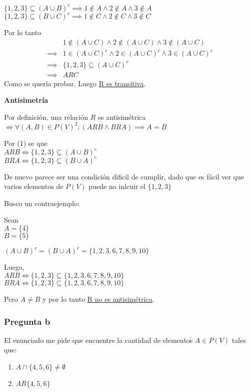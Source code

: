 $ \{ 1,2,3 \} \subseteq (A\cup B)^c \implies 1\not \in A \wedge 2 \not \in A \wedge 3 \not \in A $ \\
$ \{ 1,2,3 \} \subseteq (B\cup C)^c \implies 1\not \in C \wedge 2 \not \in C \wedge 3 \not \in C $

Por lo tanto
\begin{align*}
    & 1\not \in (A\cup C) \wedge 2 \not \in (A\cup C) \wedge 3 \not \in (A\cup C) \\
    \implies & 1 \in (A\cup C)^c \wedge 2 \in (A\cup C)^c \wedge 3 \in (A\cup C)^c \\
    \implies & \{ 1,2,3 \} \subseteq (A\cup C)^c \\
    \implies & ARC
\end{align*}
Como se quería probar. Luego \underline{R es transitiva}.

\textbf{Antisimetría}

Por definición, una relación $R$ es antisimétrica $ \iff \forall (A,B) \in P(V)^2: (ARB \wedge BRA) \implies A=B$

Por (1) se que \\
$ ARB \iff \{ 1,2,3 \} \subseteq (A\cup B)^c$ \\
$ BRA \iff \{ 1,2,3 \} \subseteq (B\cup A)^c$ 

De nuevo parece ser una condición dificil de cumplir, dado que es fácil ver que varios elementos de $ P(V) $ puede no inlcuir el $ \{ 1,2,3 \} $

Busco un contraejemplo:

Sean \\ 
$ A = \{ 4 \} $ \\
$ B = \{ 5 \} $

$ (A\cup B)^c = (B\cup A)^c = \{ 1,2,3,6,7,8,9,10 \} $

Luego, \\
$ ARB \iff \{ 1,2,3 \} \subseteq \{ 1,2,3,6,7,8,9,10 \} $ \\
$ BRA \iff \{ 1,2,3 \} \subseteq \{ 1,2,3,6,7,8,9,10 \} $ 

Pero $ A\neq B $ y por lo tanto \underline{R no es antisimétrica}.

\subsubsection{Pregunta b}

El enunciado me pide que encuentre la cantidad de elementos $ A \in P(V) $ tales que:
\begin{enumerate}[label=(\alph*)]
    \item $ A \cap \{ 4,5,6 \} \neq \emptyset $
    \item $ A R \{ 4,5,6 \}$
\end{enumerate}

